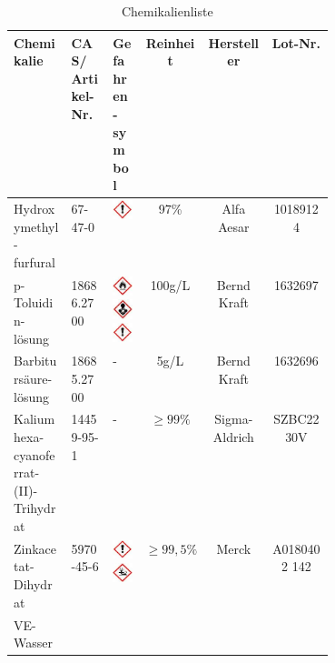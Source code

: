 \begin{table}[htbp]
    \centering
        \caption{Chemikalienliste}
        \begin{tabular}{L{0.18\linewidth}|C{0.13\linewidth}|C{0.1\linewidth}|c|c|c} 
            Chemikalie & CAS/ Artikel-Nr. & Gefahren-symbol & Reinheit & Hersteller & Lot-Nr.\\
            \hline
            Hydroxymethyl-furfural & 67-47-0 & \includegraphics{../Bilder/Ausrufezeichen.jpg} & 97\% & Alfa Aesar & 10189124\\
            \hline
            p-Toluidin-lösung & 18686.2700 & \includegraphics{../Bilder/Flamme.jpg} \includegraphics{../Bilder/Gesundheitsgefahr.jpg} \includegraphics{../Bilder/Ausrufezeichen.jpg} & 100g/L & Bernd Kraft & 1632697\\
            \hline
            Barbitursäure-lösung & 18685.2700 & - & 5g/L & Bernd Kraft & 1632696\\
            \hline
            Kaliumhexa-cyanoferrat-(II)-Trihydrat & 14459-95-1 & - & $\geq99\%$ & Sigma-Aldrich & SZBC2230V\\
            \hline
            Zinkacetat-Dihydrat & 5970-45-6 & \includegraphics{../Bilder/Ausrufezeichen.jpg} \includegraphics{../Bilder/Umwelt.jpg} & $\geq99,5\%$ & Merck & A0180402 142\\
            \hline
            VE-Wasser & & & & &
        \end{tabular}
    \label{tab:Chemikalienliste}
\end{table}

